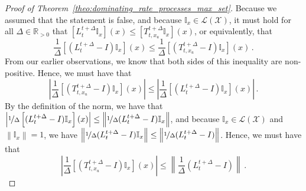 \documentclass[10pt]{paper}
\theoremstyle{definition}
\newcommand{\reals}{\mathbb{R}}
\newcommand{\realspos}{\reals_{>0}}
\newcommand{\states}{\mathcal{X}}
\newcommand{\gambles}{\mathcal{L}}
\newcommand{\gamblesX}{\gambles(\states)}
\newcommand{\ind}[1]{\mathbb{I}_{#1}}
\newcommand{\norm}[1]{\left\lVert #1 \right\rVert}
\newcommand{\abs}[1]{\left\vert #1 \right\vert}
\begin{document}
\begin{proof}[Proof of Theorem~\ref{theo:dominating_rate_processes_max_set}]
Because we assumed that the statement is false, and because $\ind{x}\in\gamblesX$, it must hold for all $\Delta\in\realspos$ that $\left[L_{t}^{t+\Delta}\ind{x}\right](x)\leq\left[T_{t,x_u}^{t+\Delta}\ind{x}\right](x)$, or equivalently, that
\begin{equation*}
\frac{1}{\Delta}\left[(L_{t}^{t+\Delta} - I)\ind{x}\right](x) \leq \frac{1}{\Delta}\left[(T_{t,x_u}^{t+\Delta} - I)\ind{x}\right](x)\,.
\end{equation*}
From our earlier observations, we know that both sides of this inequality are non-positive. Hence, we must have that
\begin{equation*}
\abs{\frac{1}{\Delta}\left[(T_{t,x_u}^{t+\Delta} - I)\ind{x}\right](x)} \leq \abs{\frac{1}{\Delta}\left[(L_{t}^{t+\Delta} - I)\ind{x}\right](x)}\,.
\end{equation*}
By the definition of the norm, we have that $\abs{\nicefrac{1}{\Delta}\left[(L_{t}^{t+\Delta} - I)\ind{x}\right](x)}\leq\norm{\nicefrac{1}{\Delta}(L_{t}^{t+\Delta} - I)\ind{x}}$, and because $\ind{x}\in\gamblesX$ and $\norm{\ind{x}}=1$, we have $\norm{\nicefrac{1}{\Delta}(L_{t}^{t+\Delta} - I)\ind{x}}\leq \norm{\nicefrac{1}{\Delta}(L_{t}^{t+\Delta} - I)}$. Hence, we must have that
\begin{equation*}
\abs{\frac{1}{\Delta}\left[(T_{t,x_u}^{t+\Delta} - I)\ind{x}\right](x)} \leq \norm{\frac{1}{\Delta}(L_{t}^{t+\Delta} - I)}\,.
\end{equation*}


\end{proof}
\end{document}
